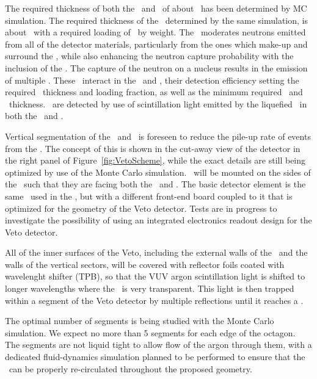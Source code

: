 The required thickness of both the \IAB\ and \OAB\ of about \DSkVetoOABThickness\ has been determined by MC simulation. The required thickness of the \GdAS\, determined by the same simulation,  is about \DSkVetoGdASThickness\ with a required  loading of \DSkVetoGdPercentage\ by weight.  The \GdAS\ moderates neutrons emitted from all of the detector materials, particularly from the ones which make-up and surround the \LArTPC, while also enhancing the neutron capture probability with the inclusion of the .  The capture of the neutron on a  nucleus results in the emission of multiple \grs.  These \grs\ interact in the \IAB\ and \OAB, their detection efficiency setting the required \GdAS\ thickness and  loading fraction, as well as the minimum required \IAB\ and \OAB\ thickness.  \grs\ are detected by use of scintillation light emitted by the liquefied \AAr\ in both the \IAB\ and \OAB. 

Vertical segmentation of the \IAB\ and \OAB\ is foreseen to reduce the pile-up rate of  events from the \AAr.  The concept of this is shown in the cut-away view of the detector in the right panel of Figure~\ref{fig:VetoScheme}, while the exact details are still being optimized by use of the Monte Carlo simulation.  \SiPMs\ will be mounted on the sides of the \GdAS\ such that they are facing both the \IAB\ and \OAB. The basic detector element is the same \DSkPdm\ used in the \TPC, but with a different front-end board coupled to it that is optimized for the geometry of the Veto detector. Tests are in progress to investigate the possibility of using an integrated electronics readout design for the Veto detector.

All of the inner surfaces of the Veto, including the external walls of the \TPC\ and the walls of the vertical sectors, will be covered with reflector foils coated with wavelenght shifter (TPB), so that the VUV argon scintillation light is shifted to longer wavelengths where the \LAr\ is very transparent. This light is then trapped within a segment of the Veto detector by multiple reflections until it reaches a \SiPM. 


The optimal number of segments is being studied with the Monte Carlo simulation. We expect no more than 5 segments for each edge of the octagon. The segments are not liquid tight to allow flow of the argon through them, with a dedicated fluid-dynamics simulation planned to be performed to ensure that the \LAr\ can be properly re-circulated throughout the proposed geometry.

